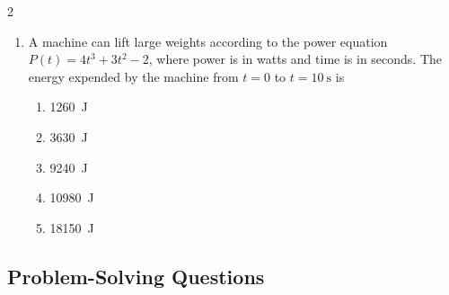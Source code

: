 {\begin{multicols*}{2}
\begin{enumerate}[leftmargin=12pt,itemsep=4pt]
    \item A machine can lift large weights according to the power equation
      $P(t)=4t^3+3t^2-2$, where power is in watts and time is in seconds. The
      energy expended by the machine from $t=0$ to $t=\SI{10}{\second}$ is
      \begin{enumerate}
      \item \SI{1260}\joule
      \item \SI{3630}\joule
      \item \SI{9240}\joule
      \item \SI{10980}\joule
      \item \SI{18150}\joule
      \end{enumerate}
    \end{enumerate}
  \end{multicols*}
}

\subsection*{Problem-Solving Questions}

